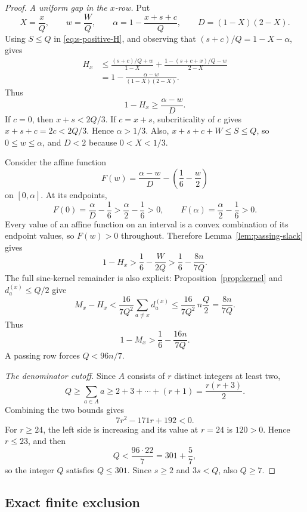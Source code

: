 \documentclass[11pt]{article}
\theoremstyle{definition}
\theoremstyle{remark}
\begin{document}
\begin{proof}
\smallskip
\noindent\emph{A uniform gap in the \(x\)-row.}
Put
\[
 X=\frac xQ,\qquad w=\frac WQ,\qquad
 \alpha=1-\frac{x+s+c}{Q},\qquad D=(1-X)(2-X).
\]
Using \(S\le Q\) in \eqref{eq:s-positive-H}, and observing that
\((s+c)/Q=1-X-\alpha\), gives
\begin{align*}
 H_x
 &\le \frac{(s+c)/Q+w}{1-X}
      +\frac{1-(s+c+x)/Q-w}{2-X}\\
 &=1-\frac{\alpha-w}{(1-X)(2-X)}.
\end{align*}
Thus
\begin{equation}\label{eq:s-positive-gap-a0}
 1-H_x\ge\frac{\alpha-w}{D}.
\end{equation}
If \(c=0\), then \(x+s<2Q/3\).  If \(c=x+s\), subcriticality of
\(c\) gives \(x+s+c=2c<2Q/3\).  Hence \(\alpha>1/3\).  Also,
\(x+s+c+W\le S\le Q\), so
\(0\le w\le\alpha\), and \(D<2\) because \(0<X<1/3\).

Consider the affine function
\[
 F(w)=\frac{\alpha-w}{D}-\left(\frac16-\frac w2\right)
\]
on \([0,\alpha]\).  At its endpoints,
\[
 F(0)=\frac\alpha D-\frac16>\frac\alpha2-\frac16>0,
 \qquad
 F(\alpha)=\frac\alpha2-\frac16>0.
\]
Every value of an affine function on an interval is a convex combination of
its endpoint values, so \(F(w)>0\) throughout.  Therefore
Lemma~\ref{lem:passing-slack} gives
\[
 1-H_x>\frac16-\frac{W}{2Q}
 >\frac16-\frac{8n}{7Q}.
\]
The full sine-kernel remainder is also explicit: Proposition~\ref{prop:kernel}
and \(d_a^{(x)}\le Q/2\) give
\[
 M_x-H_x<\frac{16}{7Q^2}\sum_{a\ne x}d_a^{(x)}
 \le\frac{16}{7Q^2}\,n\frac Q2=\frac{8n}{7Q}.
\]
Thus
\begin{equation}\label{eq:s-positive-total-gap}
 1-M_x>\frac16-\frac{16n}{7Q}.
\end{equation}
A passing row forces \(Q<96n/7\).

\smallskip
\noindent\emph{The denominator cutoff.}
Since \(A\) consists of \(r\) distinct integers
at least two,
\[
 Q\ge\sum_{a\in A}a\ge2+3+\cdots+(r+1)=\frac{r(r+3)}2.
\]
Combining the two bounds gives
\[
 7r^2-171r+192<0.
\]
For \(r\ge24\), the left side is increasing and its value at \(r=24\)
is \(120>0\).  Hence \(r\le23\), and then
\[
 Q<\frac{96\cdot22}{7}=301+\frac57,
\]
so the integer \(Q\) satisfies \(Q\le301\).  Since \(s\ge2\) and
\(3s<Q\), also \(Q\ge7\).
\end{proof}

\subsection{Exact finite exclusion}
\end{document}
